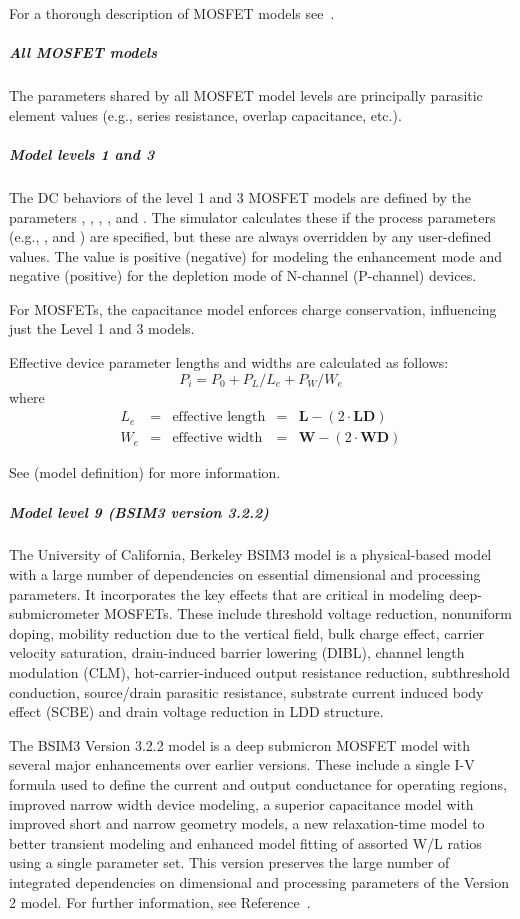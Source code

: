 For a thorough description of MOSFET models see~\cite{Antognetti:1988, HLJHCKH,
BLETK:1997, SH:1968, VL:1980,
SSKJ:1987, Pierret:1984, YEC:1983, BSIM3:V3:1, BN}.

\subparagraph{All MOSFET models}
The parameters shared by all MOSFET model levels are principally parasitic
element values (e.g., series resistance, overlap capacitance, etc.).

\subparagraph{Model levels 1 and 3}
The DC behaviors of the level 1 and 3 MOSFET models are defined by the
parameters , , , , and
.  The simulator calculates these if the process parameters
(e.g., , and ) are specified, but these are always
overridden by any user-defined values. The  value is positive
(negative) for modeling the enhancement mode and negative (positive) for the
depletion mode of N-channel (P-channel) devices.

For MOSFETs, the capacitance model enforces charge conservation,
influencing just the Level 1 and 3 models.

Effective device parameter lengths and widths are calculated as follows:
\[
P_i = P_0 + P_L / L_e + P_W / W_e
\]
where
\[
\begin{array}{rclcl}
L_e & = & \mbox{effective length} & = & \mathbf{L} - (2 \cdot \mathbf{LD}) \\
W_e & = & \mbox{effective width} & = & \mathbf{W} - (2 \cdot \mathbf{WD})
\end{array}
\]

See  (model definition) for more information.

\subparagraph{Model level 9 (BSIM3 version 3.2.2)}
The University of California, Berkeley BSIM3 model is a physical-based model
with a large number of dependencies on essential dimensional and processing
parameters.  It incorporates the key effects that are critical in modeling
deep-submicrometer MOSFETs.  These include threshold voltage reduction,
nonuniform doping, mobility reduction due to the vertical field, bulk charge
effect, carrier velocity saturation, drain-induced barrier lowering (DIBL),
channel length modulation (CLM), hot-carrier-induced output resistance
reduction, subthreshold conduction, source/drain parasitic resistance,
substrate current induced body effect (SCBE) and drain voltage reduction in LDD
structure.

The BSIM3 Version 3.2.2 model is a deep submicron MOSFET model with several major
enhancements over earlier versions.  These include a single I-V formula used
to define the current and output conductance for operating regions, improved
narrow width device modeling, a superior capacitance model with improved short
and narrow geometry models, a new relaxation-time model to better transient
modeling and enhanced model fitting of assorted W/L ratios using a single
parameter set.  This version preserves the large number of integrated
dependencies on dimensional and processing parameters of the Version 2 model.
For further information, see Reference~\cite{HLJHCKH}.

